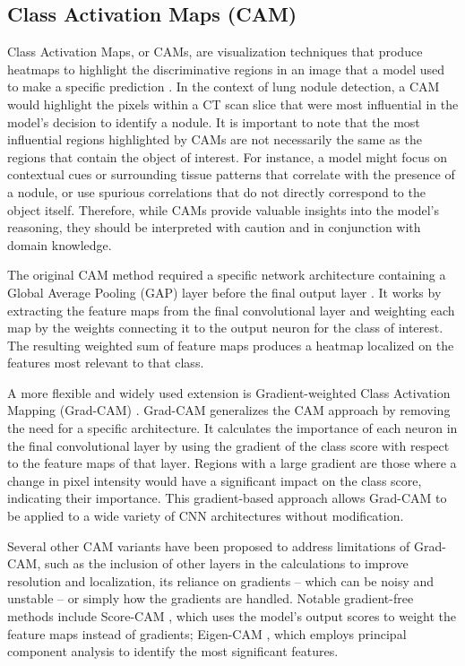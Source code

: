 \subsection{Class Activation Maps (CAM)}
Class Activation Maps, or CAMs, are visualization techniques that produce heat\-maps to highlight the discriminative regions in an image that a model used to make a specific prediction \cite{minh2023overview}. In the context of lung nodule detection, a CAM would highlight the pixels within a CT scan slice that were most influential in the model's decision to identify a nodule.
It is important to note that the most influential regions highlighted by CAMs are not necessarily the same as the regions that contain the object of interest. For instance, a model might focus on contextual cues or surrounding tissue patterns that correlate with the presence of a nodule, or use spurious correlations that do not directly correspond to the object itself. Therefore, while CAMs provide valuable insights into the model's reasoning, they should be interpreted with caution and in conjunction with domain knowledge.

The original CAM method required a specific network architecture containing a Global Average Pooling (GAP) layer before the final output layer \cite{zhou2016learning}. It works by extracting the feature maps from the final convolutional layer and weighting each map by the weights connecting it to the output neuron for the class of interest. The resulting weighted sum of feature maps produces a heatmap localized on the features most relevant to that class.

A more flexible and widely used extension is Gradient-weighted Class Activation Mapping (Grad-CAM) \cite{selvaraju2019gradcam}. Grad-CAM generalizes the CAM approach by removing the need for a specific architecture. It calculates the importance of each neuron in the final convolutional layer by using the gradient of the class score with respect to the feature maps of that layer.
Regions with a large gradient are those where a change in pixel intensity would have a significant impact on the class score, indicating their importance. This gradient-based approach allows Grad-CAM to be applied to a wide variety of CNN architectures without modification.

Several other CAM variants have been proposed to address limitations of Grad-CAM, such as the inclusion of other layers in the calculations to improve resolution and localization, its reliance on gradients -- which can be noisy and unstable -- or simply how the gradients are handled. 
Notable gradient-free methods include Score-CAM \cite{wang2020score}, which uses the model's output scores to weight the feature maps instead of gradients; Eigen-CAM \cite{muhammad2020eigen}, which employs principal component analysis to identify the most significant features.

